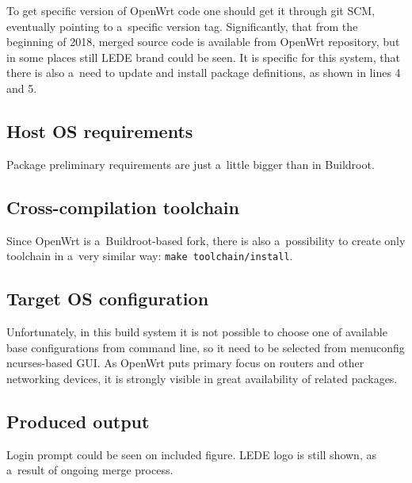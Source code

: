 \documentclass[printmode]{mgr}
\begin{document}
To get specific version of OpenWrt code one should get it through git SCM, eventually pointing to a~specific version tag.
Significantly, that from the beginning of 2018, merged source code is available from OpenWrt repository, but in some places still LEDE brand could be seen.
It is specific for this system, that there is also a~need to update and install package definitions, as shown in lines 4 and 5.

\subsection*{Host OS requirements}

Package preliminary requirements are just a~little bigger than in Buildroot.

\subsection*{Cross-compilation toolchain}

Since OpenWrt is a~Buildroot-based fork, there is also a~possibility to create only toolchain in a~very similar way: \verb|make toolchain/install|.

\subsection*{Target OS configuration}

Unfortunately, in this build system it is not possible to choose one of available base configurations from command line, so it need to be selected from menuconfig ncurses-based GUI.
As OpenWrt puts primary focus on routers and other networking devices, it is strongly visible in great availability of related packages.

\subsection*{Produced output}

Login prompt could be seen on included figure.
LEDE logo is still shown, as a~result of ongoing merge process.
\end{document}
